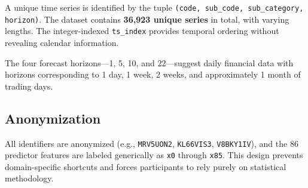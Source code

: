A unique time series is identified by the tuple \texttt{(code, sub\_code, sub\_category, horizon)}. The dataset contains \textbf{36,923 unique series} in total, with varying lengths. The integer-indexed \texttt{ts\_index} provides temporal ordering without revealing calendar information.

The four forecast horizons---1, 5, 10, and 22---suggest daily financial data with horizons corresponding to 1 day, 1 week, 2 weeks, and approximately 1 month of trading days.

\subsection{Anonymization}

All identifiers are anonymized (e.g., \texttt{MRV5UON2}, \texttt{KL66VIS3}, \texttt{V8BKY1IV}), and the 86 predictor features are labeled generically as \texttt{x0} through \texttt{x85}. This design prevents domain-specific shortcuts and forces participants to rely purely on statistical methodology.
